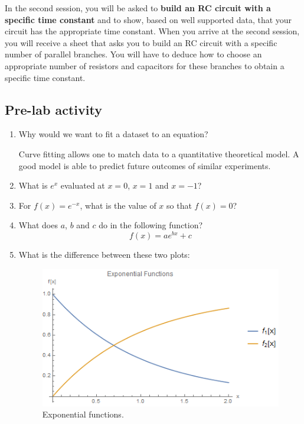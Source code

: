 \documentclass[12pt]{report}
\begin{document}
In the second session, you will be asked to \textbf{build an RC circuit with a specific time constant} and to show, based on well supported data, that your circuit has the appropriate time constant. 
When you arrive at the second session, you will receive a sheet that asks you to build an RC circuit with a specific number of parallel branches. 
You will have to deduce how to choose an appropriate number of resistors and capacitors for these branches to obtain a specific time constant.

\subsection{Pre-lab activity}
\begin{enumerate}
\item Why would we want to fit a dataset to an equation?
\begin{tcolorbox}[title=Answer]
Curve fitting allows one to match data to a quantitative theoretical model. A good model is able to predict future outcomes of similar experiments.
\end{tcolorbox}
\item What is $e^{x}$ evaluated at $x=0$, $x=1$ and $x=-1$?
\item For $f(x) = e^{-x}$, what is the value of $x$ so that $f(x)=0$?
\item What does $a$, $b$ and $c$ do in the following function?
\begin{equation}
f(x) = a e^{b x}+c
\end{equation}
\item What is the difference between these two plots:
\begin{figure}[h]
\centering
\includegraphics[width=0.8\linewidth]{lab2-prelab}
\caption{Exponential functions.}
\label{Fig:lab2-prelab}
\end{figure}
\end{enumerate}
\end{document}
